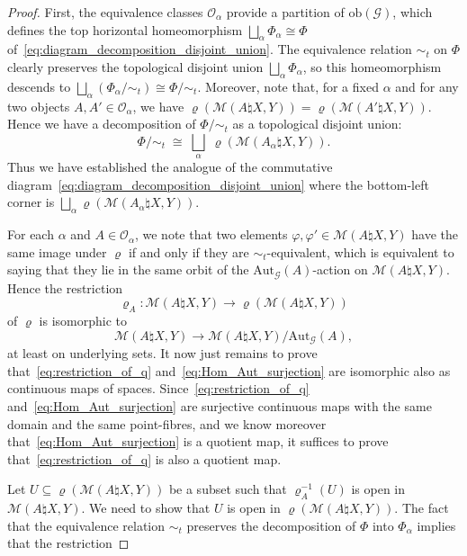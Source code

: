 \documentclass[AHL,Unicode,published]{cedram}
\newcommand{\Aut}{\mathrm{Aut}}
\newcommand{\obj}{\ensuremath{\mathrm{ob}}}
\newcommand{\cG}{\mathcal{G}}
\newcommand{\cM}{\mathcal{M}}
\newcommand{\cO}{\mathcal{O}}
\newcommand{\too}{\ensuremath{\longrightarrow}}
\begin{document}
\begin{proof}
First, the equivalence classes $\cO_{\alpha}$ provide a partition of $\obj(\cG)$, which defines the top horizontal homeomorphism $\bigsqcup_{\alpha} \Phi_{\alpha}\cong \Phi$ of~\eqref{eq:diagram_decomposition_disjoint_union}. The equivalence relation $\sim_{t}$ on $\Phi$ clearly preserves the topological disjoint union $\bigsqcup_{\alpha} \Phi_{\alpha}$, so this homeomorphism descends to $\bigsqcup_{\alpha} (\Phi_{\alpha} / {\sim_{t}}) \cong \Phi/{\sim_{t}}$. Moreover, note that, for a fixed $\alpha$ and for any two objects $A,A' \in \cO_{\alpha}$, we have $\varrho(\cM(A\natural X,Y))=\varrho(\cM(A'\natural X,Y))$. Hence we have a decomposition of $\Phi/{\sim_{t}}$ as a topological disjoint union:
\begin{equation}\label{eq:decomposition_disjoint_union_Phi}
\Phi/{\sim_{t}} \;\cong\; \bigsqcup_{\alpha} \; \varrho(\cM(A_{\alpha} \natural X,Y)).
\end{equation}
Thus we have established the analogue of the commutative diagram~\eqref{eq:diagram_decomposition_disjoint_union} where the bottom-left corner is $\bigsqcup_{\alpha} \varrho(\cM(A_{\alpha} \natural X,Y))$.

For each $\alpha$ and $A \in \cO_{\alpha}$, we note that two elements $\varphi,\varphi' \in \cM(A\natural X,Y)$ have the same image under $\varrho$ if and only if they are $\sim_{t}$-equivalent, which is equivalent to saying that they lie in the same orbit of the $\Aut_{\cG}(A)$-action on $\cM(A\natural X,Y)$. Hence the restriction
\begin{equation}\label{eq:restriction_of_q}
\varrho_{A} \colon \cM(A \natural X,Y) \too \varrho(\cM(A\natural X,Y))
\end{equation}
of $\varrho$ is isomorphic to
\begin{equation}\label{eq:Hom_Aut_surjection}
\cM(A \natural X,Y) \too \cM(A \natural X,Y) / \Aut_{\cG}(A),
\end{equation}
at least on underlying sets. It now just remains to prove that~\eqref{eq:restriction_of_q} and~\eqref{eq:Hom_Aut_surjection} are isomorphic also as continuous maps of spaces. Since~\eqref{eq:restriction_of_q} and~\eqref{eq:Hom_Aut_surjection} are surjective continuous maps with the same domain and the same point-fibres, and we know moreover that~\eqref{eq:Hom_Aut_surjection} is a quotient map, it suffices to prove that~\eqref{eq:restriction_of_q} is also a quotient map.

Let $U \subseteq \varrho(\cM(A\natural X,Y))$ be a subset such that $\varrho_{A}^{-1}(U)$ is open in $\cM(A\natural X,Y)$. We need to show that $U$ is open in $\varrho(\cM(A\natural X,Y))$. The fact that the equivalence relation $\sim_t$ preserves the decomposition of $\Phi$ into $\Phi_{\alpha}$ implies that the restriction


\end{proof}
\end{document}
